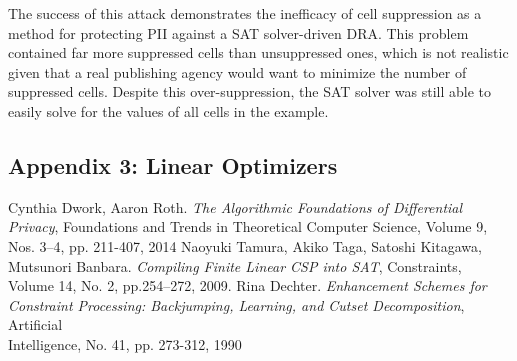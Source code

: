 \documentclass[jou,apacite]{apa6}
\begin{document}
The success of this attack demonstrates the inefficacy of
cell suppression as a method for protecting PII against
a SAT solver-driven DRA. This problem
contained far more suppressed cells than unsuppressed ones, which is not realistic given that a real publishing agency would want to minimize the number of suppressed cells. Despite this over-suppression, the SAT solver was still able to easily solve for the values of all cells in the example.

\subsection{Appendix 3: Linear Optimizers}


\begin{thebibliography}{1}
 Cynthia Dwork, Aaron Roth.
\textit{The Algorithmic Foundations of Differential Privacy}, Foundations and Trends in Theoretical Computer Science, Volume 9, Nos. 3--4, pp. 211-407, 2014
 Naoyuki Tamura, Akiko Taga, Satoshi Kitagawa, Mutsunori Banbara.
\textit{Compiling Finite Linear CSP into SAT}, Constraints, Volume 14, No. 2, pp.254--272, 2009.
 Rina Dechter.
\textit{Enhancement Schemes for Constraint Processing: Backjumping, Learning, and Cutset Decomposition}, Artificial\\ Intelligence, No. 41, pp. 273-312, 1990
\end{thebibliography}
\end{document}
